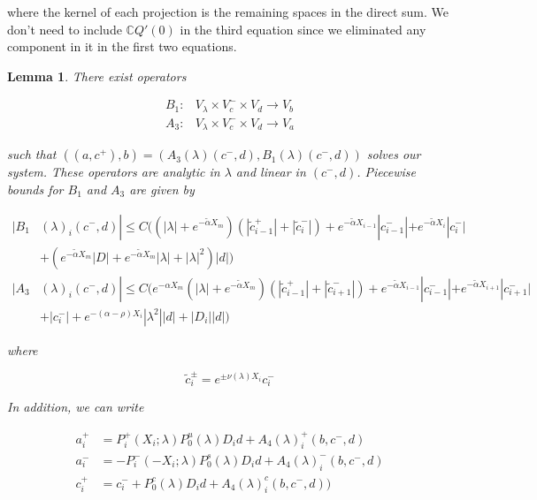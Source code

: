 \documentclass[12pt]{article}
\def\C{{\mathbb C}}
\newtheorem{lemma}{Lemma}
\begin{document}
where the kernel of each projection is the remaining spaces in the direct sum. We don't need to include $\C Q'(0)$ in the third equation since we eliminated any component in it in the first two equations.


\begin{lemma}\label{inv2}
There exist operators

\begin{align*}
B_1: &V_\lambda \times V_c^- \times V_d \rightarrow V_b \\
A_3: &V_\lambda \times V_c^- \times V_d \rightarrow V_a 
\end{align*}

such that $( (a, c^+) , b ) = ( A_3(\lambda)(c^-,d), B_1(\lambda)(c^-, d) )$ solves our system. These operators are analytic in $\lambda$ and linear in $(c^-,d)$. Piecewise bounds for $B_1$ and $A_3$ are given by

\begin{align}
|B_1&(\lambda)_i(c^-, d)| \leq C\Big( 
(|\lambda| + e^{-\tilde{\alpha}X_m})( |\tilde{c}_{i-1}^+| + |\tilde{c}_i^-|)
+ e^{-\tilde{\alpha} X_{i-1}} |c_{i-1}^-| + e^{-\tilde{\alpha} X_i} |c_i^-| \\
&+ ( e^{-\tilde{\alpha}X_m} |D| + e^{-\tilde{\alpha}X_m}|\lambda| + |\lambda|^2)|d| \Big) \\
|A_3&(\lambda)_i(c^-, d)|
\leq C \Big(  
e^{-\alpha X_m} (|\lambda| + e^{-\tilde{\alpha}X_m})(|\tilde{c}_{i-1}^+| + |\tilde{c}_{i+1}^-|) + e^{-\tilde{\alpha}X_{i-1}}|c_{i-1}^-| + e^{-\tilde{\alpha}X_{i+1}}|c_{i+1}^-| \\
&+|c_i^-| + e^{-(\alpha - \rho) X_i} |\lambda^2||d| + |D_i||d| \Big)
\end{align} 

where

\begin{equation}\label{tildec}
\tilde{c}_i^\pm = e^{\pm \nu(\lambda) X_i} c_i^-
\end{equation}

In addition, we can write

\begin{align*}
a_i^+ &= P_i^+(X_i; \lambda) P_0^u(\lambda) D_i d + A_4(\lambda)_i^+(b, c^-, d) \\
a_i^- &= -P_i^-(-X_i; \lambda) P_0^s(\lambda) D_i d + A_4(\lambda)_i^-(b, c^-, d) \\
c_i^+ &= c_i^- + P_0^c(\lambda) D_i d + A_4(\lambda)_i^c(b, c^-, d) )
\end{align*}


\end{lemma}
\end{document}
